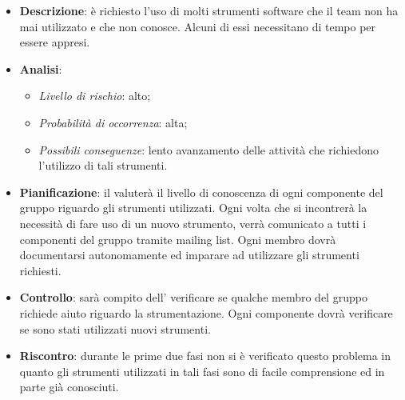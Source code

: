 			\begin{itemize}
				\item \textbf{Descrizione}: è richiesto l'uso di molti strumenti software che il team non ha mai utilizzato e che non conosce. Alcuni di essi necessitano di tempo per essere appresi.
				\item \textbf{Analisi}:
				\begin{itemize}
					\item \textit{Livello di rischio}: alto;
					\item \textit{Probabilità di occorrenza}: alta;
					\item \textit{Possibili conseguenze}: lento avanzamento delle attività che richiedono l'utilizzo di tali strumenti.
				\end{itemize}
				\item \textbf{Pianificazione}: il  valuterà il livello di conoscenza di ogni componente del gruppo riguardo gli strumenti utilizzati. Ogni volta che si incontrerà la necessità di fare uso di un nuovo strumento, verrà comunicato a tutti i componenti del gruppo tramite mailing list. Ogni membro dovrà documentarsi autonomamente ed imparare ad utilizzare gli strumenti richiesti.
				\item \textbf{Controllo}: sarà compito dell' verificare se qualche membro del gruppo richiede aiuto riguardo la strumentazione. Ogni componente dovrà verificare se sono stati utilizzati nuovi strumenti.
				\item \textbf{Riscontro}: durante le prime due fasi non si è verificato questo problema in quanto gli strumenti utilizzati in tali fasi sono di facile comprensione ed in parte già conosciuti.
			\end{itemize}
